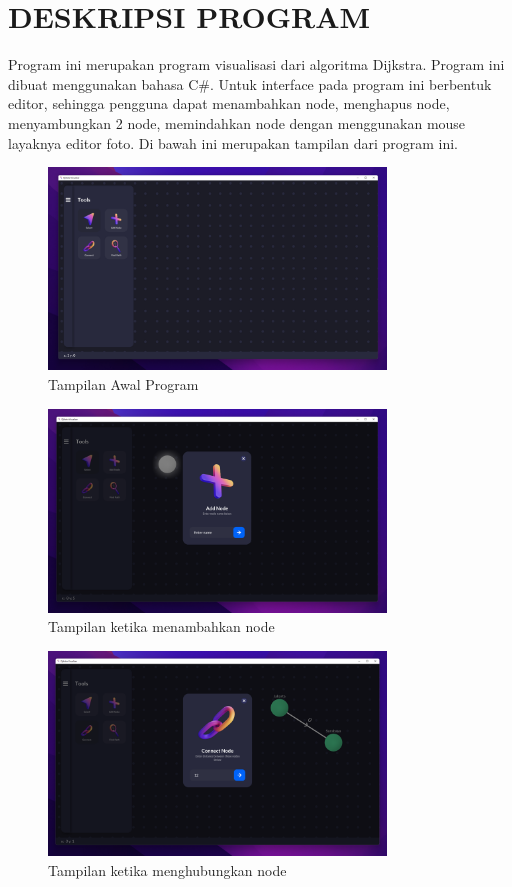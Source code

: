 \documentclass[12pt,a4paper,oneside]{article}
\begin{document}
\section{DESKRIPSI PROGRAM}
Program ini merupakan program visualisasi dari algoritma Dijkstra. Program ini dibuat menggunakan bahasa C\#. Untuk interface pada program ini berbentuk editor, sehingga pengguna dapat menambahkan node, menghapus node, menyambungkan 2 node, memindahkan node dengan menggunakan mouse layaknya editor foto. Di bawah ini merupakan tampilan dari program ini. \par
\begin{figure}[H]
	\centering
	\includegraphics[width=0.8\textwidth]{images/tampilan-awal.png}
	\caption{Tampilan Awal Program}
\end{figure}
\begin{figure}[H]
	\centering
	\includegraphics[width=0.8\textwidth]{images/add-node.png}
	\caption{Tampilan ketika menambahkan node}
\end{figure}
\begin{figure}[H]
	\centering
	\includegraphics[width=0.8\textwidth]{images/connect-node.png}
	\caption{Tampilan ketika menghubungkan node}
\end{figure}
\end{document}
